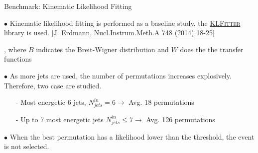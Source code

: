 \documentclass[10pt]{beamer}
\begin{document}
\begin{frame}[fragile]{Benchmark: Kinematic Likelihood Fitting}

    $\bullet$ Kinematic likelihood fitting is performed as a baseline study, the \href{https://github.com/KLFitter/KLFitter}{\textsc{KLFitter}} library is used. {\scriptsize \href{https://www.sciencedirect.com/science/article/pii/S0168900214001855?via\%3Dihub}{[J. Erdmann, Nucl.Instrum.Meth.A 748 (2014) 18-25]}}

    ,
    {\footnotesize where $B$ indicates the Breit-Wigner distribution and $W$ does the the transfer functions}
    
    
    \smallskip
    
    $\bullet$ As more jets are used, the number of permutations increases explosively.
Therefore, two case are studied.
        \begin{itemize}
            \item[-] Most energetic 6 jets, $N_{jets}^{in} = 6 \rightarrow $ Avg. 18 permutations
            \item[-] Up to 7 most energetic jets $N_{jets}^{in} \leq 7 \rightarrow$  Avg. 126 permutations
        \end{itemize}
        
    \smallskip
    
    $\bullet$ When the best permutation has a likelihood lower than the threshold, the event is not selected.



\end{frame}

\end{document}
